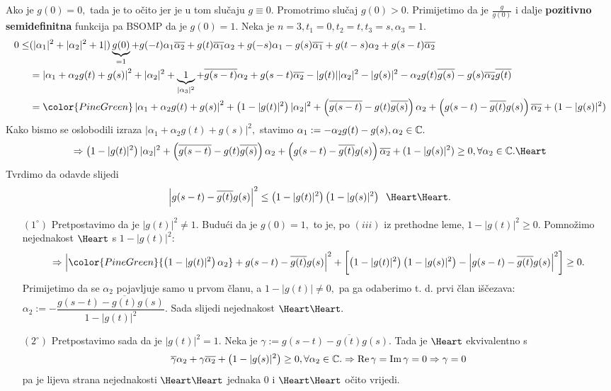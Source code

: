 \documentclass{article}
\newcommand{\myre}{\operatorname{Re}}
\newcommand{\myim}{\operatorname{Im}}
\begin{document}
Ako je \(g(0)=0,\) tada je to očito jer je u tom slučaju \(g\equiv 0.\) Promotrimo slučaj \(g(0)>0.\) Primijetimo da je \(\frac{g}{g(0)}\) i dalje \textbf{pozitivno semidefinitna} funkcija pa \textcolor{PineGreen}{BSOMP da je \(g(0)=1\)}. Neka je \(n=3, t_1=0,t_2=t,t_3=s,\alpha_3=1.\) \[\begin{aligned}0\le&(|\alpha_1|^2+|\alpha_2|^2+1|)\underbrace{g(0)}_{=1}+g(-t)\alpha_1\overline{\alpha_2}+g(t)\overline{\alpha_1}\alpha_2+g(-s)\alpha_1-g(s)\overline{\alpha_1}+g(t-s)\alpha_2+g(s-t)\overline{\alpha_2}\\&=\left|\alpha_1+\alpha_2g(t)+g(s)\right|^2+|\alpha_2|^2+\underbrace{1}_{|\alpha_3|^2}+\overline{g(s-t)}\alpha_2+g(s-t)\overline{\alpha_2}-|g(t)||\alpha_2|^2-|g(s)|^2-\alpha_2g(t)\overline{g(s)}-g(s)\overline{\alpha_2}\overline{g(t)}\\&={\color{PineGreen}\left|\alpha_1+\alpha_2g(t)+g(s)\right|^2}+\left(1-|g(t)|^2\right)|\alpha_2|^2+\left(\overline{g(s-t)}-g(t)\overline{g(s)}\right)\alpha_2+\left(g(s-t)-\overline{g(t)}g(s)\right)\overline{\alpha_2}+(1-|g(s)|^2)\end{aligned}\]  \textcolor{PineGreen}{Kako bismo se oslobodili izraza \(\left|\alpha_1+\alpha_2g(t)+g(s)\right|^2,\) stavimo \(\alpha_1:=-\alpha_2g(t)-g(s),\alpha_2\in\Bbb C.\)}  \[\Rightarrow \left(1-|g(t)|^2\right)|\alpha_2|^2+\left(\overline{g(s-t)}-g(t)\overline{g(s)}\right)\alpha_2+\left(g(s-t)-\overline{g(t)}g(s)\right)\overline{\alpha_2}+(1-|g(s)|^2)\ge 0,\forall\alpha_2\in\Bbb C.\text{\Heart}\] Tvrdimo da odavde slijedi \[\left|g(s-t)-\overline{g(t)}g(s)\right|^2\le\left(1-|g(t)|^2\right)\left(1-|g(s)|^2\right)\;\;\text{\Heart}\text{\Heart}.\] \begin{enumerate}
    \item[\((1^\circ)\)]Pretpostavimo da je \(|g(t)|^2\ne 1.\) Budući da je \(g(0)=1,\) to je, po \((iii)\) iz prethodne leme, \(1-|g(t)|^2\ge 0.\) Pomnožimo nejednakost \(\text{\Heart}\) s \(1-|g(t)|^2\): \[\Rightarrow\left|\color{PineGreen}{\left(1-|g(t)|^2\right)\alpha_2}+g(s-t)-\overline{g(t)}g(s)\right|^2+\left[\left(1-|g(t)|^2\right)\left(1-|g(s)|^2\right)-\left|g(s-t)-\overline{g(t)}g(s)\right|^2\right]\ge 0.\] Primijetimo da se \(\alpha_2\) pojavljuje samo u prvom članu, a \(1-|g(t)|\ne 0,\) \textcolor{PineGreen}{pa ga odaberimo t. d. prvi član iščezava: \(\alpha_2:=-\dfrac{g(s-t)-\overline{g(t)}g(s)}{1-|g(t)|^2}.\)} Sada slijedi nejednakost \(\text{\Heart}\text{\Heart}.\)
    \item[\((2^\circ)\)] Pretpostavimo sada da je \(|g(t)|^2=1.\) Neka je \(\gamma:=g(s-t)-\overline{g(t)}g(s).\) Tada je \(\text{\Heart}\) ekvivalentno s \[\overline\gamma\alpha_2+\gamma\overline{\alpha_2}+\left(1-|g(s)|^2\right)\ge 0,\forall\alpha_2\in\Bbb C.\Rightarrow\myre\gamma=\myim \gamma=0\Rightarrow\gamma=0\] pa je lijeva strana nejednakosti \(\text{\Heart}\text{\Heart}\) jednaka \(0\) i \(\text{\Heart}\text{\Heart}\) očito vrijedi.\end{enumerate}
\end{document}
